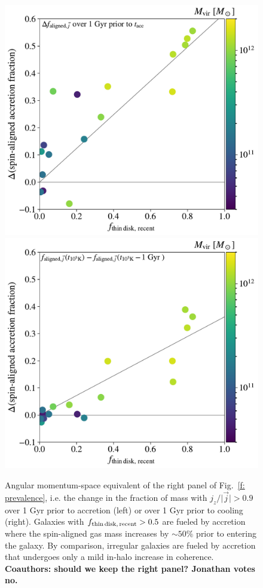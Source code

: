 \documentclass[fleqn,usenatbib]{mnras}
\newcommand{\fthin}{f_{\rm thin\,disk,\,recent}}
\begin{document}
\begin{figure}
    \centering
    \includegraphics[width=\columnwidth]{figures/variations/relative_to_accretion/prevalence/delta_smooth_jdisk_frac_v_thin_disk_frac_recent.pdf}
    \includegraphics[width=\columnwidth]{figures/variations/prepost_m1000_p0/prevalence/delta_smooth_jdisk_frac_v_thin_disk_frac_recent.pdf}
    \caption{
    Angular momentum-space equivalent of the right panel of Fig.~\ref{f: prevalence}, i.e. the change in the fraction of mass with $j_z/\vert \vec j \vert > 0.9$ over 1 Gyr prior to accretion (left) or over 1 Gyr prior to cooling (right).
    Galaxies with $\fthin > 0.5$ are fueled by accretion where the spin-aligned gas mass increases by $\sim 50\%$ prior to entering the galaxy.
    By comparison, irregular galaxies are fueled by accretion that undergoes only a mild in-halo increase in coherence.
    \textbf{Coauthors: should we keep the right panel? Jonathan votes no.}
    }
    \label{f: prevalence - angular momentum}
\end{figure}
\end{document}

